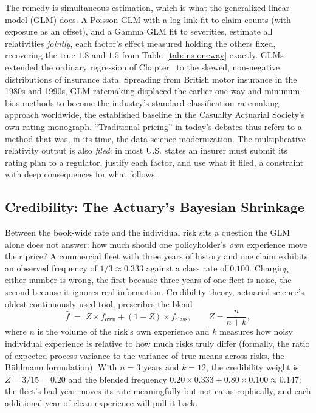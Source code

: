 \documentclass[../ai_in_finance]{subfiles}
\begin{document}
The remedy is simultaneous estimation, which is what the generalized linear model (GLM) does. A Poisson GLM with a log link fit to claim counts (with exposure as an offset), and a Gamma GLM fit to severities, estimate all relativities \emph{jointly}, each factor's effect measured holding the others fixed, recovering the true $1.8$ and $1.5$ from Table~\ref{tab:ins-oneway} exactly. GLMs extended the ordinary regression of Chapter~ to the skewed, non-negative distributions of insurance data. Spreading from British motor insurance in the 1980s and 1990s, GLM ratemaking displaced the earlier one-way and minimum-bias methods to become the industry's standard classification-ratemaking approach worldwide, the established baseline in the Casualty Actuarial Society's own rating monograph. ``Traditional pricing'' in today's debates thus refers to a method that was, in its time, the data-science modernization. The multiplicative-relativity output is also \emph{filed}: in most U.S. states an insurer must submit its rating plan to a regulator, justify each factor, and use what it filed, a constraint with deep consequences for what follows.

\subsection{Credibility: The Actuary's Bayesian Shrinkage}
\label{sec:ins-credibility}

Between the book-wide rate and the individual risk sits a question the GLM alone does not answer: how much should one policyholder's \emph{own} experience move their price? A commercial fleet with three years of history and one claim exhibits an observed frequency of $1/3 \approx 0.333$ against a class rate of $0.100$. Charging either number is wrong, the first because three years of one fleet is noise, the second because it ignores real information. Credibility theory, actuarial science's oldest continuously used tool, prescribes the blend
\begin{equation}
\hat f \;=\; Z \times \bar f_{\text{own}} + (1 - Z) \times f_{\text{class}}, \qquad Z = \frac{n}{n + k},
\label{eq:insurance-credibility}
\end{equation}
where $n$ is the volume of the risk's own experience and $k$ measures how noisy individual experience is relative to how much risks truly differ (formally, the ratio of expected process variance to the variance of true means across risks, the B\"uhlmann formulation). With $n = 3$ years and $k = 12$, the credibility weight is $Z = 3/15 = 0.20$ and the blended frequency $0.20 \times 0.333 + 0.80 \times 0.100 \approx 0.147$: the fleet's bad year moves its rate meaningfully but not catastrophically, and each additional year of clean experience will pull it back.
\end{document}
